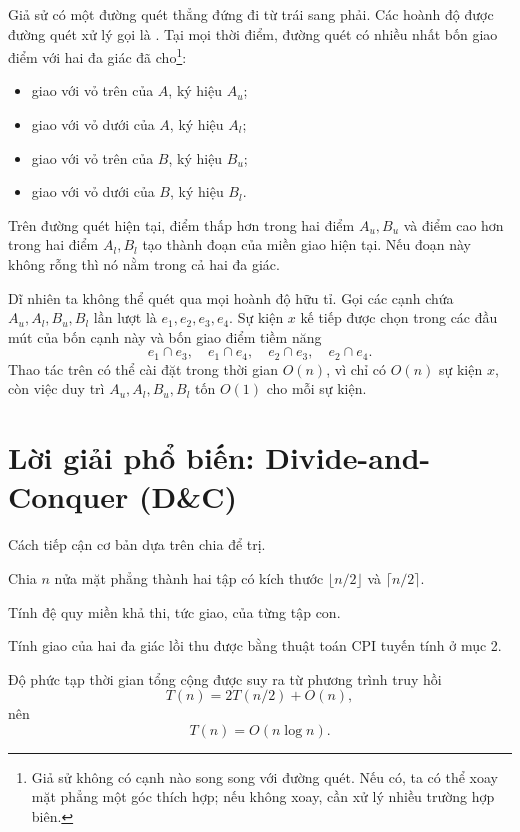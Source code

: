 \documentclass[11pt]{article}
\begin{document}
Giả sử có một đường quét thẳng đứng đi từ trái sang phải. Các hoành độ được
đường quét xử lý gọi là . Tại mọi thời điểm, đường quét có
nhiều nhất bốn giao điểm với hai đa giác đã cho\footnote{Giả sử không có cạnh
nào song song với đường quét. Nếu có, ta có thể xoay mặt phẳng một góc thích
hợp; nếu không xoay, cần xử lý nhiều trường hợp biên.}:
\begin{itemize}
  \item giao với vỏ trên của \(A\), ký hiệu \(A_u\);
  \item giao với vỏ dưới của \(A\), ký hiệu \(A_l\);
  \item giao với vỏ trên của \(B\), ký hiệu \(B_u\);
  \item giao với vỏ dưới của \(B\), ký hiệu \(B_l\).
\end{itemize}

Trên đường quét hiện tại, điểm thấp hơn trong hai điểm \(A_u,B_u\) và điểm cao
hơn trong hai điểm \(A_l,B_l\) tạo thành đoạn của miền giao hiện tại. Nếu đoạn
này không rỗng thì nó nằm trong cả hai đa giác.

Dĩ nhiên ta không thể quét qua mọi hoành độ hữu tỉ. Gọi các cạnh chứa
\(A_u,A_l,B_u,B_l\) lần lượt là \(e_1,e_2,e_3,e_4\). Sự kiện \(x\) kế tiếp
được chọn trong các đầu mút của bốn cạnh này và bốn giao điểm tiềm năng
\[
  e_1\cap e_3,\quad e_1\cap e_4,\quad e_2\cap e_3,\quad e_2\cap e_4.
\]
Thao tác trên có thể cài đặt trong thời gian \(O(n)\), vì chỉ có \(O(n)\) sự
kiện \(x\), còn việc duy trì \(A_u,A_l,B_u,B_l\) tốn \(O(1)\) cho mỗi sự kiện.

\section{Lời giải phổ biến: Divide-and-Conquer (D\&C)}

Cách tiếp cận cơ bản dựa trên chia để trị.
\begin{description}[leftmargin=7em,style=nextline]
  \item[Chia:] Chia \(n\) nửa mặt phẳng thành hai tập có kích thước
  \(\lfloor n/2\rfloor\) và \(\lceil n/2\rceil\).
  \item[Trị:] Tính đệ quy miền khả thi, tức giao, của từng tập con.
  \item[Gộp:] Tính giao của hai đa giác lồi thu được bằng thuật toán CPI tuyến
  tính ở mục 2.
\end{description}

Độ phức tạp thời gian tổng cộng được suy ra từ phương trình truy hồi
\[
  T(n)=2T(n/2)+O(n),
\]
nên
\[
  T(n)=O(n\log n).
\]
\end{document}
